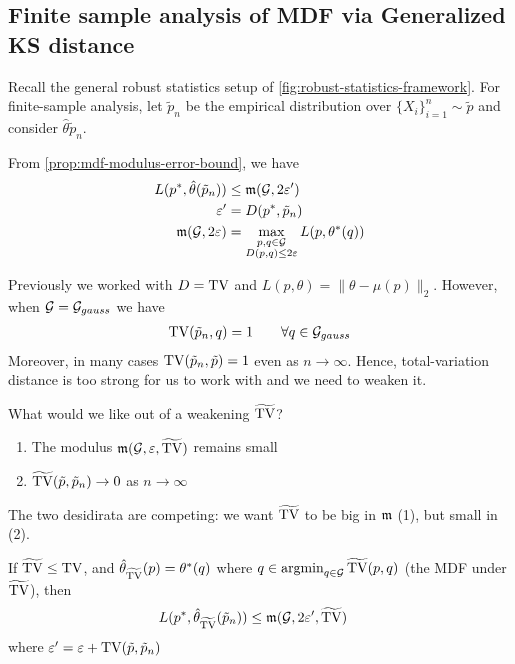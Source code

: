 \subsection{Finite sample analysis of MDF via Generalized KS distance}

Recall the general robust statistics setup of \cref{fig:robust-statistics-framework}.
For finite-sample analysis, let $\tilde{p}_n$ be the empirical distribution over $\{X_i\}_{i=1}^n \sim \tilde{p}$ and consider $\hat\theta{\tilde{p}_n}$.

From \cref{prop:mdf-modulus-error-bound}, we have
\begin{align}
    L(p^*, \hat{\theta}(\tilde{p}_n)) &\leq \mathfrak{m}(\mathcal{G}, 2 \varepsilon') \\
    \varepsilon' &= D(p^*, \tilde{p}_n) \\
    \mathfrak{m}(\mathcal{G}, 2 \varepsilon) &= \max_{\substack{p, q  \in \mathcal{G} \\ D(p,q) \leq 2 \varepsilon}} L(p, \theta^*(q))
\end{align}

Previously we worked with $D = \operatorname{TV}$ and $L(p, \theta) = \|\theta - \mu(p)\|_2$.
However, when $\mathcal{G} = \mathcal{G}_{gauss}$ we have
\begin{align}
    \operatorname{TV}(\tilde{p}_n, q) = 1 \qquad \forall q \in \mathcal{G}_{gauss}
\end{align}
Moreover, in many cases $\operatorname{TV}(\tilde{p}_n, \tilde{p}) = 1$ even as $n \to \infty$.
Hence, total-variation distance is too strong for us to work with and we need
to weaken it.

What would we like out of a weakening $\widetilde{\operatorname{TV}}$? 
\begin{enumerate}
    \item The modulus $\mathfrak{m}(\mathcal{G}, \varepsilon, \widetilde{\operatorname{TV}})$ remains small
    \item $\widetilde{\operatorname{TV}}(\tilde{p}, \tilde{p}_n) \to 0$ as $n \to \infty$
\end{enumerate}

\begin{remark}
    The two desidirata are competing: we want $\widetilde{\operatorname{TV}}$ to be big in
    $\mathfrak{m}$ (1), but small in (2).
\end{remark}

\begin{proposition}
    If $\widetilde{\operatorname{TV}} \leq \operatorname{TV}$, and $\hat{\theta}_{\widetilde{\operatorname{TV}}}(p) = \theta^*(q)$ where
    $q \in \operatorname{argmin}_{q \in \mathcal{G}} \widetilde{\operatorname{TV}}(p, q)$ (the MDF under $\widetilde{\operatorname{TV}}$), then
    \begin{align}
        L(p^*, \hat{\theta}_{\widetilde{\operatorname{TV}}}(\tilde{p}_n))
        &\leq \mathfrak{m}(\mathcal{G}, 2 \varepsilon', \widetilde{\operatorname{TV}})
    \end{align}
    where $\varepsilon' = \varepsilon + \operatorname{TV}(\tilde{p}, \tilde{p}_n)$
\end{proposition}


